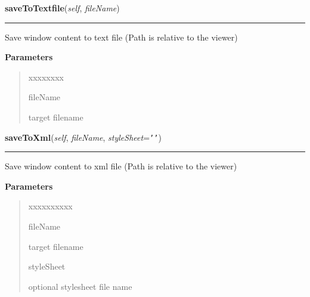 \hspace{.8\funcindent}\begin{boxedminipage}{\funcwidth}

    \raggedright \textbf{saveToTextfile}(\textit{self}, \textit{fileName})

    \vspace{-1.5ex}

    \rule{\textwidth}{0.5\fboxrule}
\setlength{\parskip}{2ex}
    Save window content to text file  (Path is relative to the viewer)

\setlength{\parskip}{1ex}
      \textbf{Parameters}
      \vspace{-1ex}

      \begin{quote}
        \begin{Ventry}{xxxxxxxx}

          \item[fileName]

          target filename

        \end{Ventry}

      \end{quote}

    \end{boxedminipage}

    \label{tracetool:WinTrace:saveToXml}

    \vspace{0.5ex}

\hspace{.8\funcindent}\begin{boxedminipage}{\funcwidth}

    \raggedright \textbf{saveToXml}(\textit{self}, \textit{fileName}, \textit{styleSheet}={\tt \texttt{'}\texttt{}\texttt{'}})

    \vspace{-1.5ex}

    \rule{\textwidth}{0.5\fboxrule}
\setlength{\parskip}{2ex}
    Save window content to xml file (Path is relative to the viewer)

\setlength{\parskip}{1ex}
      \textbf{Parameters}
      \vspace{-1ex}

      \begin{quote}
        \begin{Ventry}{xxxxxxxxxx}

          \item[fileName]

          target filename

          \item[styleSheet]

          optional stylesheet file name

        \end{Ventry}

      \end{quote}

    \end{boxedminipage}


